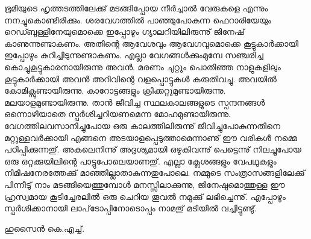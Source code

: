 ഭൂമിയുടെ ഹൃത്തടത്തിലേക്കു് മടങ്ങിപ്പോയ നീര്‍ച്ചാല്‍ വേരുകളെ എന്നും നനച്ചുകൊണ്ടിരിക്കും. ശരവേഗത്തില്‍ പാഞ്ഞുപോകുന്ന ഫെറാരിയേയും റെഡ്ബുള്ളിനേയുമൊക്കെ ഇപ്പോഴും ഗ്യാലറിയിലിരുന്നു് ജിനേഷ് കാണുന്നുണ്ടാകണം. അതിന്റെ ആവേശവും ആവേഗവുമൊക്കെ കൂട്ടുകാര്‍ക്കായി ഇപ്പോഴും കുറിച്ചിടുന്നുണ്ടാകണം. എല്ലാ വേഗങ്ങള്‍ക്കുംമുമ്പേ സഞ്ചരിച്ച കൊച്ചുകൂട്ടുകാരനായിരുന്നു അവന്‍. മരണം ചുറ്റും പൊതിഞ്ഞ നാളുകളിലും കൂട്ടുകാര്‍ക്കായി അവന്‍ അറിവിന്റെ വളപ്പൊട്ടുകള്‍ കരുതിവച്ചു. അവയില്‍ കോമിക്സുണ്ടായിരുന്നു. കാറോട്ടങ്ങളും ക്രിക്കറ്റുമുണ്ടായിരുന്നു. മലയാളമുണ്ടായിരുന്നു. താന്‍ ജീവിച്ച സ്ഥലകാലങ്ങളുടെ സ്പന്ദനങ്ങള്‍ ഒന്നൊഴിയാതെ സ്പര്‍ശിച്ചറിയണമെന്ന മോഹമുണ്ടായിരുന്നു. വേഗത്തിലവസാനിച്ചുപോയ ഒരു കാലത്തിലിരുന്നു് ജീവിച്ചുപോകുന്നതിനെ മറ്റുള്ളവര്‍ക്കായി എങ്ങനെ അടയാളപ്പെടുത്താമെന്നാണു് ഈ വരികള്‍ നമ്മെ പഠിപ്പിക്കുന്നതു്. അകലെനിന്നു് അദൃശ്യമായി ഒഴുകിവന്നു് പെട്ടെന്നു് നിലച്ചുപോയ ഒരു ഒറ്റക്കുയിലിന്റെ പാട്ടുപോലെയാണതു്. എല്ലാ ക്ലേശങ്ങളും വേപഥുകളും നിമിഷനേരത്തേക്കു് മാഞ്ഞില്ലാതാകുന്നതുപോലെ. നമ്മുടെ സംത്രാസങ്ങളിലേക്കു് പിന്നീടു് നാം മടങ്ങിയെത്തുമ്പോള്‍ മനസ്സിലാക്കുന്നു, ജിനേഷുമൊത്തുള്ള ഈ ഹ്രസ്വമായ കൂടിച്ചേരലില്‍ ഒരു ചെറിയ തൂവല്‍ നമുക്കു് ലഭിച്ചെന്നു്. എപ്പോഴും സ്പര്‍ശിക്കാനായി ലാപ്‌ടോപ്പിനോടൊപ്പം നാമതു് മടിയില്‍ വച്ചിട്ടുണ്ടു്.

\begin{flushright}ഹുസൈന്‍ കെ.എച്ച്. \end{flushright}
\newpage
